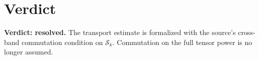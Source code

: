 \documentclass[11pt]{article}
\begin{document}
\section{Verdict}

\textbf{Verdict: resolved.} The transport estimate is formalized with the
source's cross-band commutation condition on $\mathcal S_k$. Commutation on
the full tensor power is no longer assumed.



\end{document}
